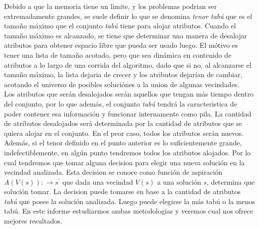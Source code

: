 Debido a que la memoria tiene un limite, y los problemas podrian ser extremadamente grandes, se suele definir lo que se denomina \textit{tenor tabú} que es el tamaño máximo que el conjunto \textit{tabú} tiene para alojar atributos. Cuando el tamaño máximo es alcanzado, se tiene que determinar una manera de desalojar atributos para obtener espacio libre que pueda ser usado luego. El mótivo es tener una lista de tamaño acotado, pero que sea dinámica en contenido de atributos a lo largo de una corrida del algoritmo, dado que si no, al alcanzarse el tamaño máximo, la lista dejaria de crecer y los atributos dejarían de cambiar, acotando el universo de posibles soluciónes a la union de algunas vecindades.\\
Los atributos que serán desalojados serán aquellos que tengan más tiempo dentro del conjunto, por lo que además, el conjunto \textit{tabú} tendrá la caracteristica de poder contener esa información y funcionar internamente como pila. 
La cantidad de atributos desalojados será determinada por la cantidad de atributos que se quiera alojar en el conjunto. En el peor caso, todos los atributos serán nuevos.\\

Además, si el tenor definido en el punto anterior es lo suficientemente grande, indefectiblemente, en algún punto tendremos todos los atributos alojados. Por lo cual tendremos que tomar alguna decision para elegir una nueva solución en la vecindad analizada. Esta decision se conoce como función de aspiración $A(V(s)): \rightarrow s^{'}$ que dada una vecindad $V(s)$ a una solución $s$, determina que solución tomar.
La decision puede tomarse en base a la cantidad de atributos \textit{tabú} que posee la solución analizada. Luego puede elegirse la más tabú o la menos tabú.
En este informe estudiarmos ambas metodologias y veremos cual nos ofrece mejores resultados.\\




 
 